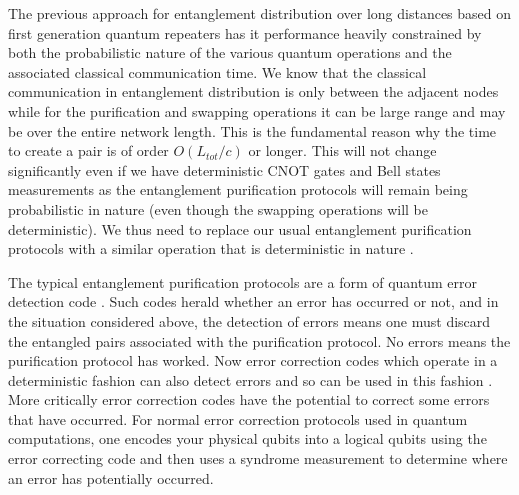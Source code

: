 \documentclass[twocolumn, aps, rmp, amsmath, amssymb, nofootinbib, superscriptaddress, longbibliography, floatfix, table-of-contents, eqsecnum]{revtex4-1}
\begin{document}
The previous approach for entanglement distribution over long distances based on first generation quantum repeaters has it performance  heavily constrained by both the probabilistic nature of the various quantum operations and the associated classical communication time. We know that the classical communication in entanglement distribution is only between the adjacent nodes while for the purification and swapping operations it can be large range and may be over the entire network length. This is the fundamental reason why the time to create a pair is of order $O(L_{tot} / c)$ or longer. This will not change significantly even if we have deterministic CNOT gates and Bell states measurements as the entanglement purification protocols  will remain being probabilistic in nature (even though the swapping operations will be deterministic). We thus need to replace our usual entanglement purification protocols with a similar operation that is deterministic in nature \cite{jiang09,munro10}.

The typical entanglement purification protocols are a form of quantum error detection code \cite{WJM2015,devitt2013}. Such codes herald whether an error has occurred or not, and in the situation considered above, the detection of errors means one must discard the entangled pairs associated with the purification protocol. No errors means the purification protocol has worked. Now error correction codes which operate in a deterministic fashion can also detect errors and so can be used in this fashion \cite{jiang09,munro10}. More critically error correction codes have the potential to correct some errors that have occurred.  For normal error correction protocols used in quantum computations, one encodes your physical qubits into a logical qubits using the error correcting code and then uses a syndrome measurement to determine where an error has potentially occurred.
\end{document}
